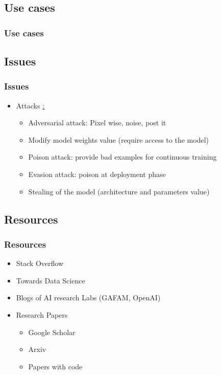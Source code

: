 \subsection{Use cases}
\begin{frame}\frametitle{Use cases}

\end{frame}



\subsection{Issues}
\begin{frame}\frametitle{Issues}
   \begin{itemize}
      \item Attacks \href{https://viso.ai/deep-learning/adversarial-machine-learning/}:
   \begin{itemize}
      \item Adversarial attack: Pixel wise, noise, post it
      \item Modify model weights value (require access to the model)
      \item Poison attack: provide bad examples for continuous training
      \item Evasion attack: poison at deployment phase
      \item Stealing of the model (architecture and parameters value)
   \end{itemize}
   \end{itemize}
\end{frame}



\subsection{Resources}
\begin{frame}\frametitle{Resources}
   \begin{itemize}
      \item Stack Overflow
      \item Towards Data Science
      \item Blogs of AI research Labs (GAFAM, OpenAI)
      \item Research Papers
      \begin{itemize}
         \item Google Scholar
         \item Arxiv
         \item Papers with code
      \end{itemize}
   \end{itemize}
\end{frame}



